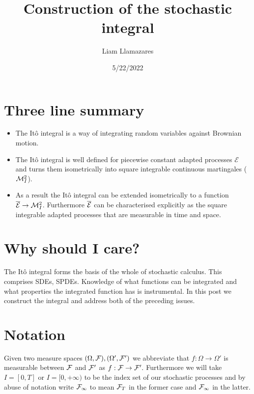 \documentclass[12pt]{article}
\begin{document}
\title{Construction of the stochastic integral}
\author{Liam Llamazares}
\date{5/22/2022}
\maketitle
\section{Three line summary}
\begin{itemize}
	\item The Itô integral is a way of integrating random variables against Brownian motion.
	\item The Itô integral is well defined for piecewise constant adapted processes $\mathcal{E}$ and turns them isometrically into square integrable continuous martingales ($\mathcal{M}_I^2$).
	\item As a result the Itô integral can be extended isometrically to a function $\overline{\mathcal{E}}\to \mathcal{M}_I^2$. Furthermore $\overline{\mathcal{E}}$ can be characterised explicitly as the square integrable adapted processes that are measurable in time and space. \end{itemize}
\section{Why should I care?}
The Itô integral forms the basis of the whole of stochastic calculus. This comprises SDEs, SPDEs. Knowledge of what functions can be integrated and what properties the integrated function has is instrumental. In this post we construct the integral and address both of the preceding issues.
\section{Notation}
Given two measure spaces $(\Omega,\mathcal{F}),(\Omega',\mathcal{F}')$ we abbreviate that $f:\Omega\to\Omega'$ is measurable between $\mathcal{F}$ and $\mathcal{F}'$ as
$f:\mathcal{F}\to\mathcal{F}'.$ Furthermore we will take $I=[0,T]$ or $I=[0,+\infty)$ to be the index set of our stochastic processes and by abuse of notation write $\mathcal{F}_\infty$ to mean $\mathcal{F}_T$ in the former case and $\mathcal{F}_\infty$ in the latter.
\end{document}

